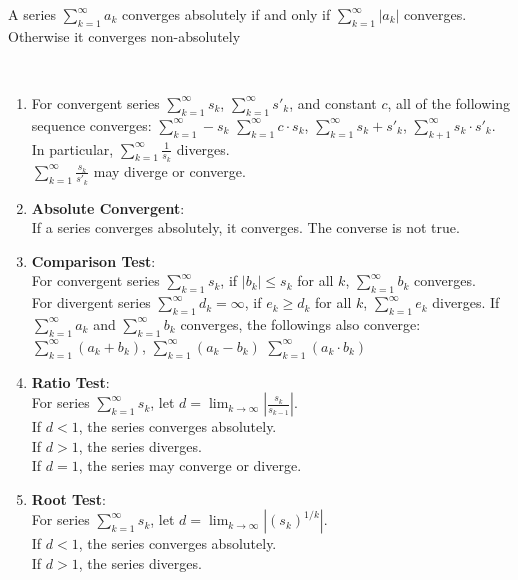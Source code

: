 \documentclass[../note.tex]{subfiles}
\begin{document}
\begin{definition} A series $\sum^{\infty}_{k=1}a_k$ converges absolutely if and only if $\sum^{\infty}_{k=1}|a_k|$ converges. Otherwise it converges non-absolutely
\end{definition}
\begin{theorem}\label{th:ConvergenceReveries}
\ 
\begin{enumerate}
	\item For convergent series $\sum^{\infty}_{k=1} s_k$, $\sum^{\infty}_{k=1}s'_k$, and constant $c$, all of the following sequence converges:
		$\sum^{\infty}_{k=1}-s_k$ $\sum^{\infty}_{k=1}c\cdot s_k$, $\sum^{\infty}_{k=1}s_k+s'_k$, $\sum^{\infty}_{k+1}s_k\cdot s'_k$.\\
		In particular, $\sum^{\infty}_{k=1}\frac{1}{s_k}$ diverges.\\
		$\sum^{\infty}_{k=1}\frac{s_k}{s'_k}$ may diverge or converge.
	\item \label{th:ConvergenceReveries:en:absoluteconverge} \textbf{Absolute Convergent}:\\
		If a series converges absolutely, it converges. The converse is not true. 
	\item \textbf{Comparison Test}:\\
		For convergent series $\sum^{\infty}_{k=1}s_k$, if $|b_k|\leq s_k$ for all $k$, $\sum^{\infty}_{k=1}b_k$ converges.\\
		For divergent series $\sum^{\infty}_{k=1}d_k = \infty$, if $e_k\geq d_k$ for all $k$, $\sum^{\infty}_{k=1}e_k$ diverges. 
		If $\sum^{\infty}_{k=1}a_k $ and $\sum^{\infty}_{k=1}b_k$ converges, the followings also converge:
		$\sum^{\infty}_{k=1}(a_k+b_k) $, $\sum^{\infty}_{k=1}(a_k-b_k) $ $\sum^{\infty}_{k=1}(a_k\cdot b_k)$
	\item \textbf{Ratio Test}:\\
		For series $\sum^{\infty}_{k=1}s_k$, let $d=\lim_{k \to \infty} |\frac{s_k}{s_{k-1}}|$.\\
		If $d<1$, the series converges absolutely.\\
		If $d>1$, the series diverges.\\
		If $d=1$, the series may converge or diverge.
	\item \textbf{Root Test}:\\
		For series $\sum^{\infty}_{k=1}s_k$, let $d=\lim_{k \to \infty} |(s_k)^{1/k}|$.\\
		If $d<1$, the series converges absolutely.\\
		If $d>1$, the series diverges.\\

\end{enumerate}
\end{theorem}
\end{document}
